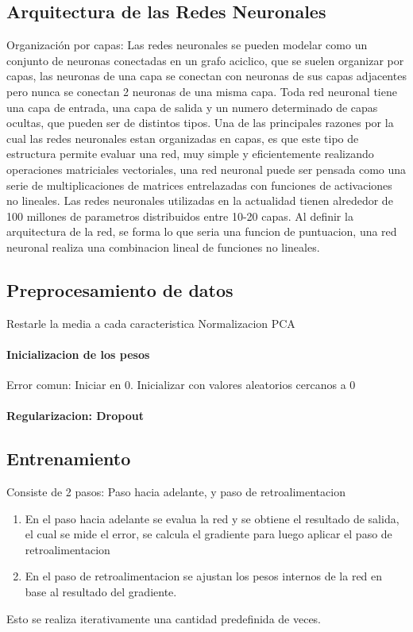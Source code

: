 \documentclass[a4paper,12pt,spanish]{book}
\begin{document}
    \subsection {Arquitectura de las Redes Neuronales}
      Organización por capas: Las redes neuronales se pueden modelar como un conjunto de neuronas conectadas en un grafo aciclico, que se suelen organizar por capas, las neuronas de una capa
      se conectan con neuronas de sus capas adjacentes pero nunca se conectan 2 neuronas de una misma capa.
      Toda red neuronal tiene una capa de entrada, una capa de salida y un numero determinado de capas ocultas, que pueden ser de distintos tipos.
      Una de las principales razones por la cual las redes neuronales estan organizadas en capas, es que este tipo de estructura permite evaluar una red, muy simple y eficientemente realizando
      operaciones matriciales vectoriales, una red neuronal puede ser pensada como una serie de multiplicaciones de matrices entrelazadas con funciones de activaciones no lineales.
      Las redes neuronales utilizadas en la actualidad tienen alrededor de 100 millones de parametros distribuidos entre 10-20 capas.
      Al definir la arquitectura de la red, se forma lo que seria una funcion de puntuacion, una red neuronal realiza una combinacion lineal de funciones no lineales. 

    \subsection {Preprocesamiento de datos}
	Restarle la media a cada caracteristica
	Normalizacion
	PCA

    \paragraph {Inicializacion de los pesos}
      Error comun: Iniciar en 0.
      Inicializar con valores aleatorios cercanos a 0 

    \paragraph {Regularizacion: Dropout}


    \subsection {Entrenamiento}
      Consiste de 2 pasos: Paso hacia adelante, y paso de retroalimentacion
      \begin{enumerate}
      \item En el paso hacia adelante se evalua la red y se obtiene el resultado de salida, el cual se mide el error, se calcula el gradiente para luego aplicar el paso de retroalimentacion
	\item En el paso de retroalimentacion se ajustan los pesos internos de la red en base al resultado del gradiente.
      \end{enumerate}
      Esto se realiza iterativamente una cantidad predefinida de veces.
\end{document}
